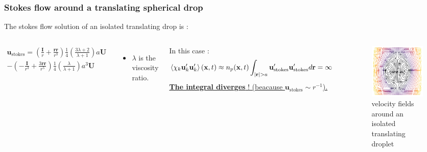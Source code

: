 \documentclass{sintefbeamer}
\begin{document}
\begin{frame}
  \frametitle{Stokes flow around a translating spherical drop}
  The stokes flow solution of an isolated translating drop is :
  \begin{columns}
  \begin{multline*}
    \textbf{u}_\text{stokes} 
    = \left(\frac{ \textbf{I}}{r} + \frac{\textbf{rr}}{r^3}\right)  \frac{1}{4}\left(\frac{3\lambda + 2}{\lambda +1}\right) a \textbf{U}\\
    - \left(-\frac{\textbf{I}}{r^3} + \frac{3 \textbf{rr} }{r^5}\right)  \frac{1}{4}\left(\frac{\lambda}{\lambda +1}\right) a^3 \textbf{U}
  \end{multline*}
  \begin{itemize}
      \item $\lambda$ is the viscosity ratio.
  \end{itemize}

  In this case : 
  \begin{align*}
    \left<\chi_k \textbf{u}'_k\textbf{u}'_k\right>(\textbf{x},t)
    &\approx n_p(\textbf{x},t)\int_{|\textbf{r}| > a} \textbf{u}'_\text{stokes}\textbf{u}'_\text{stokes}   d\textbf{r}
    =\infty 
  \end{align*}
  \underline{\textbf{The integral diverges}  ! (beacause $\textbf{u}_\text{stokes} \sim r^{-1}$).}


  \begin{figure}
    \caption{velocity fields around an isolated translating droplet}
    \includegraphics[width=\textwidth]{image/Rising_Stokes.png}
  \end{figure}
  \end{columns}
\end{frame}
\end{document}

